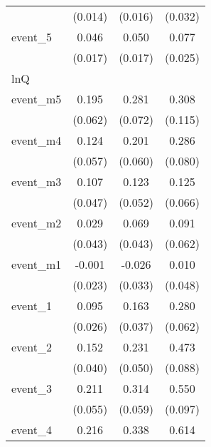 {\begin{tabular}{l*{3}{c}}
            &     (0.014)         &     (0.016)         &     (0.032)         \\
[1em]
event\_5     &       0.046\sym{**} &       0.050\sym{**} &       0.077\sym{**} \\
            &     (0.017)         &     (0.017)         &     (0.025)         \\
\hline
lnQ         &                     &                     &                     \\
event\_m5    &       0.195\sym{**} &       0.281\sym{***}&       0.308\sym{**} \\
            &     (0.062)         &     (0.072)         &     (0.115)         \\
[1em]
event\_m4    &       0.124\sym{*}  &       0.201\sym{***}&       0.286\sym{***}\\
            &     (0.057)         &     (0.060)         &     (0.080)         \\
[1em]
event\_m3    &       0.107\sym{*}  &       0.123\sym{*}  &       0.125         \\
            &     (0.047)         &     (0.052)         &     (0.066)         \\
[1em]
event\_m2    &       0.029         &       0.069         &       0.091         \\
            &     (0.043)         &     (0.043)         &     (0.062)         \\
[1em]
event\_m1    &      -0.001         &      -0.026         &       0.010         \\
            &     (0.023)         &     (0.033)         &     (0.048)         \\
[1em]
event\_1     &       0.095\sym{***}&       0.163\sym{***}&       0.280\sym{***}\\
            &     (0.026)         &     (0.037)         &     (0.062)         \\
[1em]
event\_2     &       0.152\sym{***}&       0.231\sym{***}&       0.473\sym{***}\\
            &     (0.040)         &     (0.050)         &     (0.088)         \\
[1em]
event\_3     &       0.211\sym{***}&       0.314\sym{***}&       0.550\sym{***}\\
            &     (0.055)         &     (0.059)         &     (0.097)         \\
[1em]
event\_4     &       0.216\sym{**} &       0.338\sym{***}&       0.614\sym{***}\\

\end{tabular}}
